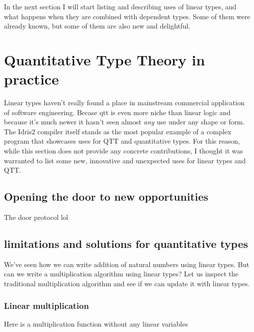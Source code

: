 \documentclass[
]{article}
\begin{document}
In the next section I will start listing and describing uses of linear
types, and what happens when they are combined with dependent types.
Some of them were already known, but some of them are also new and
delightful.

\hypertarget{quantitative-type-theory-in-practice}{%
\section{Quantitative Type Theory in
practice}\label{quantitative-type-theory-in-practice}}

Linear types haven't really found a place in mainstream commercial
application of software engineering. Becase qtt is even more niche than
linear logic and because it's much newer it hasn't seen almost
\emph{any} use under any shape or form. The Idris2 compiler itself
stands as the most popular example of a complex program that showcases
uses for QTT and quantitative types. For this reason, while this section
does not provide any concrete contributions, I thought it was warranted
to list some new, innovative and unexpected uses for linear types and
QTT.

\hypertarget{opening-the-door-to-new-opportunities}{%
\subsection{Opening the door to new
opportunities}\label{opening-the-door-to-new-opportunities}}

The door protocol lol

\hypertarget{limitations-and-solutions-for-quantitative-types}{%
\subsection{limitations and solutions for quantitative
types}\label{limitations-and-solutions-for-quantitative-types}}

We've seen how we can write addition of natural numbers using linear
types. But can we write a multiplication algorithm using linear types?
Let us inspect the traditional multiplication algorithm and see if we
can update it with linear types.

\hypertarget{linear-multiplication}{%
\subsubsection{Linear multiplication}\label{linear-multiplication}}

Here is a multiplication function without any linear variables
\end{document}
